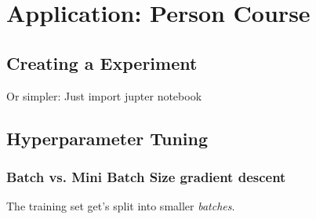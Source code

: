 \section{Application: Person Course}
\subsection{Creating a Experiment}

Or simpler: Just import jupter notebook




\subsection{Hyperparameter Tuning} 




\subsubsection{Batch vs. Mini Batch Size gradient descent}

The training set get's split into smaller \textit{batches}.



